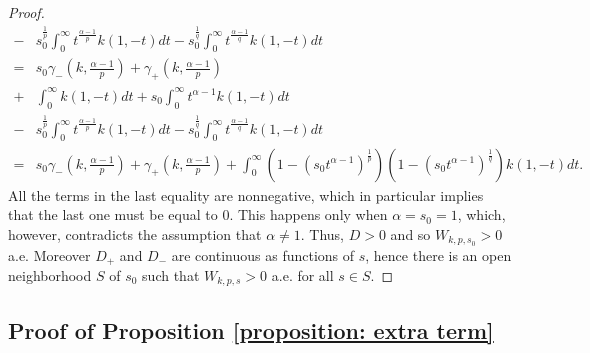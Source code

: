 \documentclass[12pt, a4paper]{amsart}
\begin{document}
\begin{proof}
\begin{align*}
    - &s_0^{\frac{1}{p}}\int_{0}^{\infty}t^{\frac{\alpha-1}{p}}k\left(1,-t\right)dt - s_0^{\frac{1}{q}}\int_{0}^{\infty}t^{\frac{\alpha-1}{q}}k\left(1,-t\right)dt
    \\
    = &s_0\gamma_-\left(k, \frac{\alpha-1}{p}\right) + \gamma_+\left(k, \frac{\alpha-1}{p}\right) 
    \\
    + &\int_{0}^{\infty}k\left(1,-t\right)dt+s_0\int_0^{\infty}t^{\alpha-1}k(1, -t)dt 
    \\
    - &s_0^{\frac{1}{p}}\int_{0}^{\infty}t^{\frac{\alpha-1}{p}}k\left(1,-t\right)dt - s_0^{\frac{1}{q}}\int_{0}^{\infty}t^{\frac{\alpha-1}{q}}k\left(1,-t\right)dt
    \\
    = &s_0\gamma_-\left(k, \frac{\alpha-1}{p}\right) + \gamma_+\left(k, \frac{\alpha-1}{p}\right) + \int_{0}^{\infty}\left(1 - (s_0 t^{\alpha-1})^{\frac{1}{p}}\right)\left(1 - (s_0 t^{\alpha-1})^{\frac{1}{q}}\right)k(1, -t)dt.
\end{align*}
All the terms in the last equality are nonnegative, which in particular implies that the last one must be equal to $0$. This happens only when $\alpha = s_0 = 1$, which, however, contradicts  the assumption that $\alpha \neq 1$. Thus, $D > 0$ and so $W_{k, p, s_0} > 0$ a.e. Moreover $D_+$ and $D_-$ are continuous as functions of $s$, hence there is an  open neighborhood $S$ of $s_0$ such that $W_{k,p,s} > 0$ a.e. for all $s \in S$.
\end{proof}

\subsection*{Proof of Proposition \texorpdfstring{\cref{proposition: extra term}}{proposition: extra term}}
\end{document}
